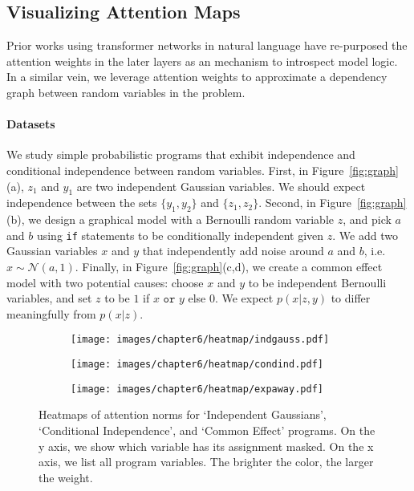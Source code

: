 \subsection{Visualizing Attention Maps}

Prior works \cite{binder2016layer,voita2019analyzing,abnar2020quantifying,chefer2021transformer} using transformer networks in natural language have re-purposed the attention weights in the later layers as an mechanism to introspect model logic. In a similar vein, we leverage attention weights to approximate a dependency graph between random variables in the problem.

\paragraph{Datasets} We study simple probabilistic programs that exhibit independence and conditional independence between random variables. First, in Figure~\ref{fig:graph}(a), $z_1$ and $y_1$ are two independent Gaussian variables. We should expect independence between the sets $\{y_1, y_2\}$ and $\{z_1, z_2\}$. Second, in Figure~\ref{fig:graph}(b), we design a graphical model with a Bernoulli random variable $z$, and pick $a$ and $b$ using \texttt{if} statements to be conditionally independent given $z$. We add two Gaussian variables $x$ and $y$ that independently add noise around $a$ and $b$, i.e. $x \sim \mathcal{N}(a, 1)$. Finally, in Figure~\ref{fig:graph}(c,d), we create a common effect model with two potential causes: choose $x$ and $y$ to be independent Bernoulli variables, and set $z$ to be $1$ if $x \texttt{ or } y$ else $0$. We expect $p(x|z, y)$ to differ meaningfully from $p(x|z)$.

\begin{figure}[tbh]
  \centering
  \begin{subfigure}[b]{0.30\textwidth}
    \centering
    \texttt{[image: images/chapter6/heatmap/indgauss.pdf]}
    \caption{}
  \end{subfigure}
  \hfill
  \begin{subfigure}[b]{0.30\textwidth}
    \centering
    \texttt{[image: images/chapter6/heatmap/condind.pdf]}
    \caption{}
  \end{subfigure}
  \hfill
  \begin{subfigure}[b]{0.30\textwidth}
    \centering
    \texttt{[image: images/chapter6/heatmap/expaway.pdf]}
    \caption{}
  \end{subfigure}
\caption{Heatmaps of attention norms for `Independent Gaussians', `Conditional Independence', and `Common Effect' programs. On the y axis, we show which variable has its assignment masked. On the x axis, we list all program variables. The brighter the color, the larger the weight.}
\label{fig:heatmap}
\end{figure}


